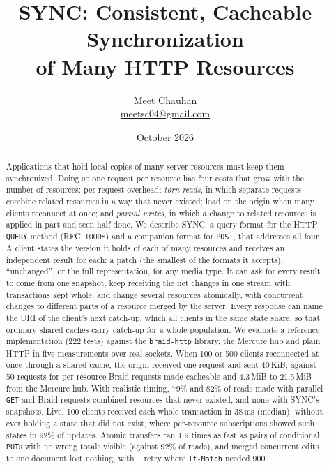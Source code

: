 \documentclass[11pt,a4paper]{article}
\title{\textbf{SYNC: Consistent, Cacheable Synchronization\\of Many HTTP Resources}}
\author{Meet Chauhan\\
\small\href{mailto:meetsc04@gmail.com}{meetsc04@gmail.com}}
\date{October 2026}
\begin{document}
\maketitle

\begin{abstract}
Applications that hold local copies of many server resources must keep them synchronized. Doing so one request per resource has four costs that grow with the number of resources: per-request overhead; \emph{torn reads}, in which separate requests combine related resources in a way that never existed; load on the origin when many clients reconnect at once; and \emph{partial writes}, in which a change to related resources is applied in part and seen half done. We describe SYNC, a query format for the HTTP \texttt{QUERY} method (RFC~10008) and a companion format for \texttt{POST}, that addresses all four. A client states the version it holds of each of many resources and receives an independent result for each: a patch (the smallest of the formats it accepts), ``unchanged'', or the full representation, for any media type. It can ask for every result to come from one snapshot, keep receiving the net changes in one stream with transactions kept whole, and change several resources atomically, with concurrent changes to different parts of a resource merged by the server. Every response can name the URI of the client's next catch-up, which all clients in the same state share, so that ordinary shared caches carry catch-up for a whole population. We evaluate a reference implementation (222 tests) against the \texttt{braid-http} library, the Mercure hub and plain HTTP in five measurements over real sockets. When 100 or 500 clients reconnected at once through a shared cache, the origin received one request and sent 40\,KiB, against 50 requests for per-resource Braid requests made cacheable and 4.3\,MiB to 21.5\,MiB from the Mercure hub. With realistic timing, 79\% and 82\% of reads made with parallel \texttt{GET} and Braid requests combined resources that never existed, and none with SYNC's snapshots. Live, 100 clients received each whole transaction in 38\,ms (median), without ever holding a state that did not exist, where per-resource subscriptions showed such states in 92\% of updates. Atomic transfers ran 1.9 times as fast as pairs of conditional \texttt{PUT}s with no wrong totals visible (against 92\% of reads), and merged concurrent edits to one document lost nothing, with 1 retry where \texttt{If-Match} needed 900.
\end{abstract}
\end{document}
